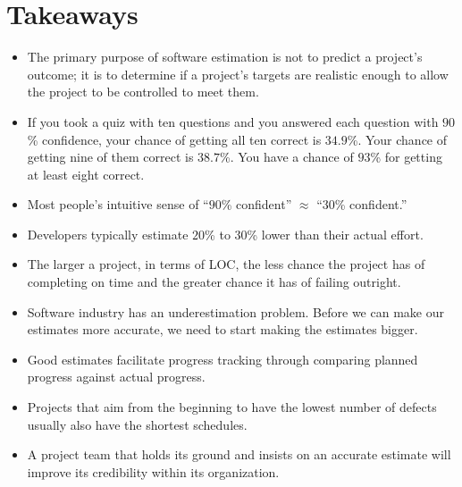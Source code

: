 \documentclass[12pt]{article}
\begin{document}
\section*{Takeaways}
\begin{itemize}
\item The primary purpose of software estimation is not to predict a project's outcome; it is to determine if a project's targets are realistic enough to allow the project to be controlled to meet them.

\item If you took a quiz with ten questions and you answered each question with $90$\% confidence, your chance of getting all ten correct is $34.9$\%. Your chance of getting nine of them correct is $38.7$\%. You have a chance of $93$\% for getting at least eight correct.

\item Most people's intuitive sense of ``$90$\% confident'' $\approx$ ``$30$\% confident.''

\item Developers typically estimate $20$\% to $30$\% lower than their actual effort.

\item The larger a project, in terms of LOC, the less chance the project has of completing on time and the greater chance it has of failing outright.

\item Software industry has an underestimation problem. Before we can make our estimates more accurate, we need to start making the estimates bigger.

\item Good estimates facilitate progress tracking through comparing planned progress against actual progress.

\item Projects that aim from the beginning to have the lowest number of defects usually also have the shortest schedules.

\item A project team that holds its ground and insists on an accurate estimate will improve its credibility within its organization.
\end{itemize}
\end{document}
